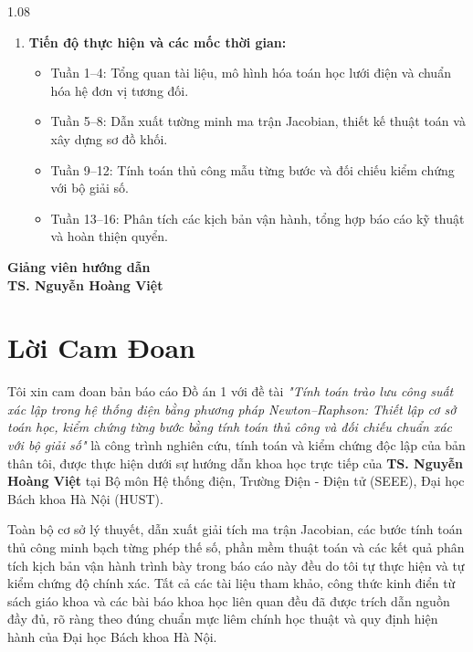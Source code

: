 \documentclass[12pt,a4paper,oneside]{report}
\begin{document}
\begin{spacing}{1.08}
\begin{enumerate}
\begin{itemize}
    \end{itemize}
    \item \textbf{Tiến độ thực hiện và các mốc thời gian:}
    \begin{itemize}\setlength{\itemsep}{0pt}\setlength{\parskip}{0pt}
        \item Tuần 1--4: Tổng quan tài liệu, mô hình hóa toán học lưới điện và chuẩn hóa hệ đơn vị tương đối.
        \item Tuần 5--8: Dẫn xuất tường minh ma trận Jacobian, thiết kế thuật toán và xây dựng sơ đồ khối.
        \item Tuần 9--12: Tính toán thủ công mẫu từng bước và đối chiếu kiểm chứng với bộ giải số.
        \item Tuần 13--16: Phân tích các kịch bản vận hành, tổng hợp báo cáo kỹ thuật và hoàn thiện quyển.
    \end{itemize}
\end{enumerate}

\vspace{15pt}
\begin{flushright}
\begin{minipage}[t]{0.5\textwidth}
    \centering
    \textbf{Giảng viên hướng dẫn}\\[35pt]
    \textbf{TS. Nguyễn Hoàng Việt}
\end{minipage}
\end{flushright}
\end{spacing}

\clearpage

\chapter*{Lời Cam Đoan}

Tôi xin cam đoan bản báo cáo Đồ án 1 với đề tài \textit{"Tính toán trào lưu công suất xác lập trong hệ thống điện bằng phương pháp Newton--Raphson: Thiết lập cơ sở toán học, kiểm chứng từng bước bằng tính toán thủ công và đối chiếu chuẩn xác với bộ giải số"} là công trình nghiên cứu, tính toán và kiểm chứng độc lập của bản thân tôi, được thực hiện dưới sự hướng dẫn khoa học trực tiếp của \textbf{TS. Nguyễn Hoàng Việt} tại Bộ môn Hệ thống điện, Trường Điện - Điện tử (SEEE), Đại học Bách khoa Hà Nội (HUST).

Toàn bộ cơ sở lý thuyết, dẫn xuất giải tích ma trận Jacobian, các bước tính toán thủ công minh bạch từng phép thế số, phần mềm thuật toán và các kết quả phân tích kịch bản vận hành trình bày trong báo cáo này đều do tôi tự thực hiện và tự kiểm chứng độ chính xác. Tất cả các tài liệu tham khảo, công thức kinh điển từ sách giáo khoa và các bài báo khoa học liên quan đều đã được trích dẫn nguồn đầy đủ, rõ ràng theo đúng chuẩn mực liêm chính học thuật và quy định hiện hành của Đại học Bách khoa Hà Nội.
\end{document}
